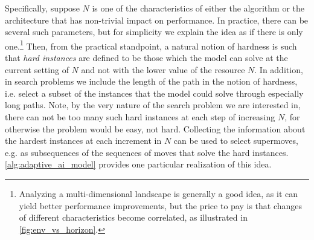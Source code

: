 Specifically, suppose $N$ is one of the characteristics of either the algorithm or the architecture that has non-trivial impact on performance. In practice, there can be several such parameters, but for simplicity we explain the idea as if there is only one.\footnote{Analyzing a multi-dimensional landscape is generally a good idea, as it can yield better performance improvements, but the price to pay is that changes of different characteristics become correlated, as illustrated in \autoref{fig:env_vs_horizon}.} Then, from the practical standpoint, a natural notion of hardness is such that \textit{hard instances} are defined to be those which the model can solve at the current setting of $N$ and not with the lower value of the resource $N$. In addition, in search problems we include the length of the path in the notion of hardness, i.e. select a subset of the instances that the model could solve through especially long paths. Note, by the very nature of the search problem we are interested in, there can not be too many such hard instances at each step of increasing $N$, for otherwise the problem would be easy, not hard. Collecting the information about the hardest instances at each increment in $N$ can be used to select supermoves, e.g. as subsequences of the sequences of moves that solve the hard instances. \autoref{alg:adaptive_ai_model} provides one particular realization of this idea.

